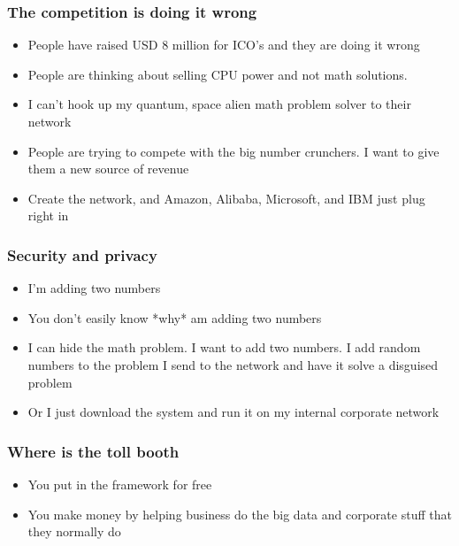 \documentclass{beamer}
\begin{document}
\begin{frame}
  \frametitle{The competition is doing it wrong}
  \begin{itemize}
    \item People have raised USD 8 million for ICO's and they are
      doing it wrong
    \item People are thinking about selling CPU power and not
      math solutions.
    \item I can't hook up my quantum, space alien math problem solver
      to their network
    \item People are trying to compete with the big number crunchers.
      I want to give them a new source of revenue
    \item Create the network, and Amazon, Alibaba, Microsoft, and IBM
      just plug right in
  \end{itemize}
\end{frame}
\begin{frame}
  \frametitle{Security and privacy}
  \begin{itemize}
  \item I'm adding two numbers
  \item You don't easily know *why* am adding two numbers
  \item I can hide the math problem.  I want to add two numbers.  I add
    random numbers to the problem I send to the network and have it
    solve a disguised problem
  \item Or I just download the system and run it on my internal
    corporate network
  \end{itemize}
\end{frame}
\begin{frame}
  \frametitle{Where is the toll booth}
  \begin{itemize}
  \item You put in the framework for free
  \item You make money by helping business do the big data and
      corporate stuff that they normally do
  \end{itemize}
\end{frame}
\end{document}
